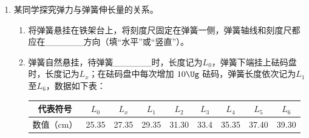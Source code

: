 \documentclass[\gkver]{gaokaozhenti}
\begin{document}
\begin{enumerate}
\begin{enumerate}
	（$a$）将滑动变阻器$R_{1}$的阻值置于最\_\_\_\_\_处（填“大”或“小”）；将$S_{2}$拨向接点1，闭合$S_{1}$，调节$R_{1}$，使电流表示数为$I_{0}$；

	（$b$）将电阻箱$R_{2}$的阻值调至最\_\_\_\_\_\_（填“大”或“小”）；将$S_{2}$拨向接点2；保持$R_{1}$不变，调节$R_{2}$，使电流表示数仍为$I_{0}$，此时$R_{2}$阻值为$1280\,\UO$；
	\item
	由此可知，圆柱体的电阻为\_\_\_\_\_\_$\UO$。
\end{enumerate}
{figs/34_1b.png}
{figs/34_1c.png}

\item
某同学探究弹力与弹簧伸长量的关系。
\begin{enumerate}
	\item
	将弹簧悬挂在铁架台上，将刻度尺固定在弹簧一侧，弹簧轴线和刻度尺都应在\_\_\_\_\_\_方向（填“水平”或“竖直”）。
	\item
	弹簧自然悬挂，待弹簧\_\_\_\_\_\_时，长度记为$L_{0}$，弹簧下端挂上砝码盘时，长度记为$L_{x}$；在砝码盘中每次增加 $10\Ug$ 砝码，弹簧长度依次记为$L_{1}$至$L_{6}$，数据如下表：
	\begin{center}
	\begin{tabular}{|c|c|c|c|c|c|c|c|c|}
	\hline
	代表符号 & $L_{0}$ & $L_{x}$ & $L_{1}$ & $L_{2}$ & $L_{3}$ & $L_{4}$ & $L_{5}$ & $L_{6}$ \\ \hline
	数值（cm） & 25.35 & 27.35 & 29.35 & 31.30 & 33.4 & 35.35 & 37.40 & 39.30 \\ \hline
	\end{tabular}
	\end{center}


\end{enumerate}
\end{enumerate}
\end{document}
